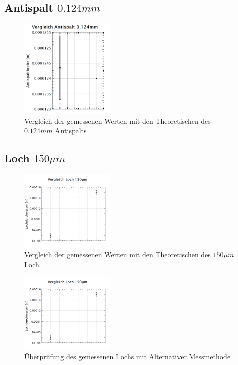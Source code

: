 \subsection*{Antispalt $0.124mm$}
\begin{figure}[h!]
	\centering
	\includegraphics[width=0.4\textwidth]{data/dis_asp_12.png}
	\caption{Vergleich der gemessenen Werten mit den Theoretischen des $0.124mm$ Antispalts}
	\label{fig:dis_aspalt_12}
\end{figure}

\subsection*{Loch $150\mu m$}
\begin{figure}[h!]
	\centering
	\includegraphics[width=0.4\textwidth]{data/dis_loch_150.png}
	\caption{Vergleich der gemessenen Werten mit den Theoretischen des $150\mu m$ Loch}
	\label{fig:dis_loch_150}
\end{figure}

\begin{figure}[h!]
	\centering
	\includegraphics[width=0.4\textwidth]{data/dis_loch_150.png}
	\caption{Überprüfung des gemessenen Lochs mit Alternativer Messmethode}
	\label{fig:dis_loch_150}
\end{figure}

